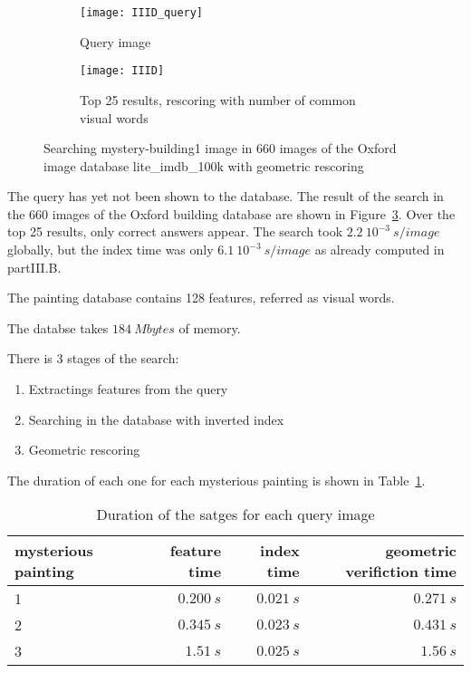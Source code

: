 \documentclass{article}
\begin{document}
\begin{figure}[ht!]
	\begin{subfigure}[b]{0.9\textwidth}
		\centering
		\texttt{[image: IIID\_query]}
		\caption{Query image}
		\label{fig:III_D1}
	\end{subfigure}

	\begin{subfigure}[b]{0.9\textwidth}
		\centering
		\texttt{[image: IIID]}
		\caption{Top 25 results, rescoring with number of common visual words}
		\label{fig:III_D2}
	\end{subfigure}

	\caption{Searching mystery-building1 image in 660 images of the Oxford image database lite\_imdb\_100k with geometric rescoring}
	\label{fig:IIID}
\end{figure}


The query has yet not been shown to the database. The result of the search in the 660 images of the Oxford building database are shown in Figure~\ref{fig:IIID}. Over the top 25 results, only correct answers appear. The search took \(2.2~10^{-3}~s/image\) globally, but the index time was only \(6.1~10^{-3}~s/image\) as already computed in partIII.B.


The painting database contains 128 features, referred as visual words.

The databse takes \(184~Mbytes\) of memory.

There is 3 stages of the search:
\begin{enumerate}
	\item Extractings features from the query
	\item Searching in the database with inverted index
	\item Geometric rescoring
\end{enumerate}
The duration of each one for each mysterious painting is shown in Table~\ref{tab:IV}.

\begin{table}[ht!]
	\centering
	\begin{tabular}{|l|r|r|r|} \hline
		mysterious painting & feature time & index time  & geometric verifiction time \\\hline
		1                   & \(0.200~s\)  & \(0.021~s\) & \(0.271~s\)                \\\hline
		2                   & \(0.345~s\)  & \(0.023~s\) & \(0.431~s\)                \\\hline
		3                   & \(1.51~s\)   & \(0.025~s\) & \(1.56~s\)                 \\\hline
	\end{tabular}
	\caption{Duration of the satges for each query image}
	\label{tab:IV}
\end{table}
\end{document}
